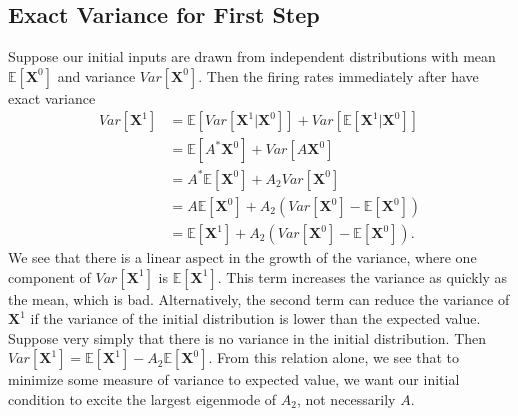 \documentclass[superscriptaddress]{revtex4-1}
\begin{document}
\subsection{Exact Variance for First Step}
Suppose our initial inputs are drawn from independent distributions with mean $\mathbb{E}[\bm{X}^0]$ and variance $Var[\bm{X}^0]$. Then the firing rates immediately after have exact variance
\begin{align*}
Var[\bm{X}^1] 
&= \mathbb{E}[Var[\bm{X}^1|\bm{X}^0]] + Var[\mathbb{E}[\bm{X}^1|\bm{X}^0]]\\
&= \mathbb{E}[A^*\bm{X}^0] + Var[A\bm{X}^0]\\
&= A^*\mathbb{E}[\bm{X}^0] + A_2 Var[\bm{X}^0]\\
&= A\mathbb{E}[\bm{X}^0] + A_2 (Var[\bm{X}^0] - \mathbb{E}[\bm{X}^0])\\
&= \mathbb{E}[\bm{X}^1] + A_2 (Var[\bm{X}^0] - \mathbb{E}[\bm{X}^0]).
\end{align*}
We see that there is a linear aspect in the growth of the variance, where one component of $Var[\bm{X}^1]$ is $\mathbb{E}[\bm{X}^1]$. This term increases the variance as quickly as the mean, which is bad. Alternatively, the second term can reduce the variance of $\bm{X}^1$ if the variance of the initial distribution is lower than the expected value. Suppose very simply that there is no variance in the initial distribution. Then $Var[\bm{X}^1] = \mathbb{E}[\bm{X}^1] - A_2\mathbb{E}[\bm{X}^0]$. From this relation alone, we see that to minimize some measure of variance to expected value, we want our initial condition to excite the largest eigenmode of $A_2$, not necessarily $A$. 
\end{document}
